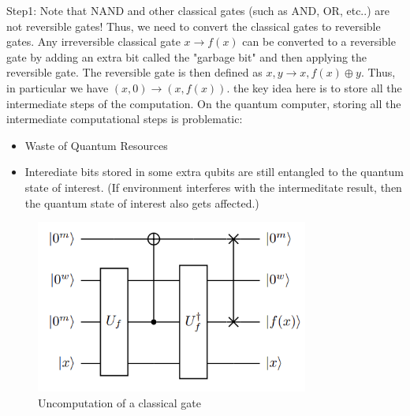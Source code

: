 \documentclass[12pt, oneside]{book}
\theoremstyle{definition}
\theoremstyle{definition}
\theoremstyle{remark}
\begin{document}
Step1: Note that NAND and other classical gates (such as AND, OR, etc..) are not reversible gates! Thus, we need to convert the classical gates to reversible gates.
Any irreversible classical gate $x \rightarrow f(x)$ can be converted to a reversible gate by adding an extra bit called the "garbage bit" and then applying the reversible gate.
The reversible gate is then defined as $x,y \rightarrow x,f(x)\oplus y$.
Thus, in particular we have $(x,0) \rightarrow (x,f(x))$.
the key idea here is to store all the intermediate steps of the computation.
On the quantum computer, storing all the intermediate computational steps is problematic:
\begin{itemize}
    \item Waste of Quantum Resources
    \item Interediate bits stored in some extra qubits are still entangled to the quantum state of interest. (If environment interferes with the
    intermeditate result, then the quantum state of interest also gets affected.)
\end{itemize}
\begin{figure}[H]
    \centering
    \includegraphics[width=0.8\textwidth]{../images/uncomputation.png}
    \caption{Uncomputation of a classical gate}
    \label{fig:uncomp}
\end{figure}
\end{document}
